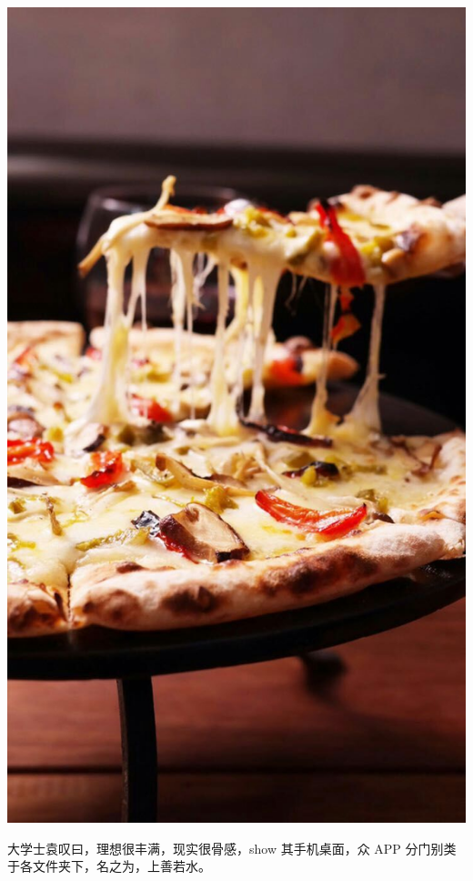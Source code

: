 \documentclass[12pt, a4paper]{book}
\begin{document}
\begin{CJK}{UTF8}{gbsn}
    \begin{center}
    \includegraphics[height=0.3\textheight]{./figure/desktop-1.jpg}
    \end{center}

    大学士袁叹曰，理想很丰满，现实很骨感，show 其手机桌面，众 APP 分门别类于各文件夹下，名之为，上善若水。


\end{CJK}
\end{document}
